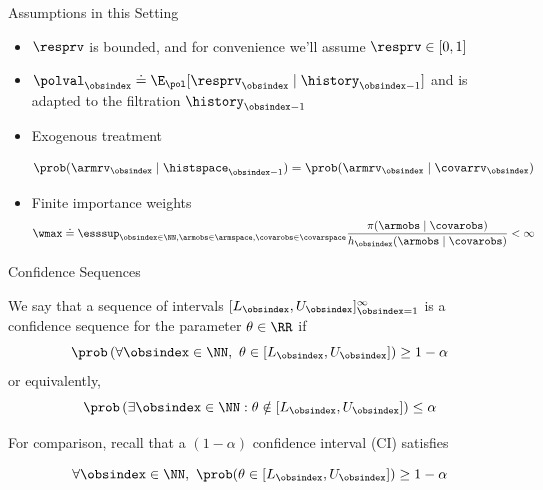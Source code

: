 \documentclass[aspectratio=169, professionalfonts]{beamer}
\begin{document}
\begin{frame}{Assumptions in this Setting}
	\begin{itemize}
		\item $\resprv$ is bounded, and for convenience we'll assume $\resprv \in [0,1]$
		      \vfill
		\item $\polval_{\obsindex} \doteq \E_{\pol} [\resprv_{\obsindex} \mid
				      \history_{\obsindex-1}]$ and is adapted to the filtration $\history_{\obsindex-1}$
		      \vfill

		\item 	Exogenous treatment

		      $$\prob(\armrv_{\obsindex} \mid \histspace_{\obsindex - 1}) =
			      \prob(\armrv_{\obsindex} \mid \covarrv_{\obsindex})$$

		\item Finite importance weights
		      \[\wmax \doteq \esssup_{\obsindex \in \NN, \armobs \in \armspace, \covarobs \in
				      \covarspace} \frac{\pi(\armobs \mid \covarobs)}{h_{\obsindex}(\armobs \mid
				      \covarobs)} < \infty\]
	\end{itemize}






\end{frame}


\begin{frame}{Confidence Sequences}
	\begin{definition}
		We say that a sequence of intervals $[L_\obsindex, U_\obsindex]_{\obsindex=1}^\infty$ is a confidence sequence for the parameter $\theta \in \RR$ if
		\begin{equation*}\label{eq:cs}
			\prob \left ( \forall \obsindex \in \NN,\ \theta \in [L_\obsindex, U_\obsindex] \right ) \geq 1-\alpha \end{equation*}
		or equivalently,
		\begin{equation*}
			\prob \left ( \exists \obsindex \in \NN : \theta \notin [L_\obsindex, U_\obsindex] \right ) \leq \alpha
		\end{equation*}
	\end{definition}

	\vfill \pause
	For comparison, recall that a $(1- \alpha)$ confidence interval (CI) satisfies

	$$\forall \obsindex \in \NN,\ \prob(\theta \in [L_\obsindex, U_\obsindex]) \geq 1-\alpha$$
\end{frame}
\end{document}
